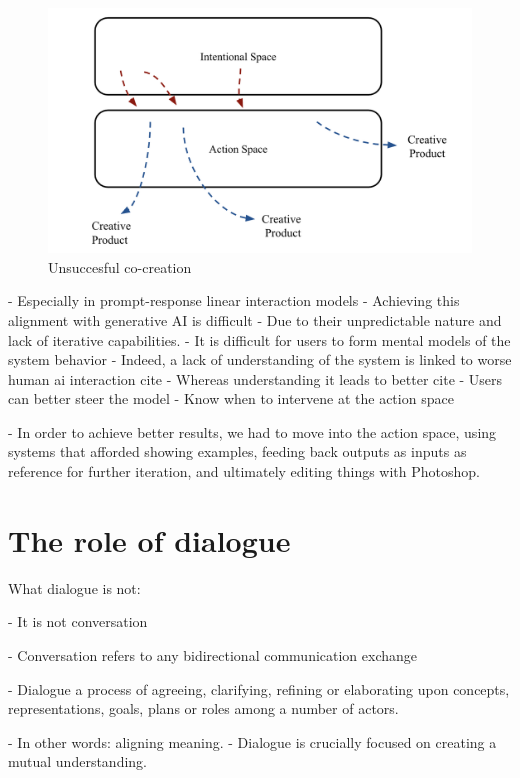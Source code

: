 \begin{figure}
    \centering
    \includegraphics[width=1\linewidth]{unsuccesfulcreation.png}
    \caption{Unsuccesful co-creation}
    \label{fig:enter-label}
\end{figure}


- Especially in prompt-response linear interaction models
- Achieving this alignment with generative AI is difficult
- Due to their unpredictable nature and lack of iterative capabilities.
- It is difficult for users to form mental models of the system behavior
- Indeed, a lack of understanding of the system is linked to worse human ai interaction {cite}
- Whereas understanding it leads to better {cite}
- Users can better steer the model
- Know when to intervene at the action space




- In order to achieve better results, we had to move into the action space, using systems that afforded showing examples, feeding back outputs as inputs as reference for further iteration, and ultimately editing things with Photoshop. 

\section{The role of dialogue}

What dialogue is not: 

- It is not conversation

- Conversation refers to any bidirectional communication exchange

- Dialogue a process of agreeing,   clarifying,   refining or elaborating upon concepts, representations, goals, plans or roles among a number of actors.

- In other words: aligning meaning. 
- Dialogue is crucially focused on creating a mutual understanding. 

